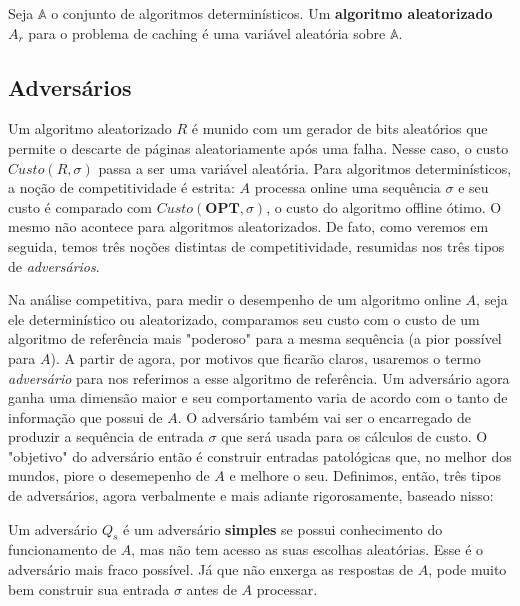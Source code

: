 \begin{definition}
  Seja \(\mathbb{A}\) o conjunto de algoritmos determinísticos. Um \textbf{algoritmo aleatorizado} \(A_r\) para o problema de caching é uma variável aleatória sobre \(\mathbb{A}\). 
\end{definition}


\subsection{Adversários}

Um algoritmo aleatorizado \(R\) é munido com um gerador de bits aleatórios que permite o descarte de páginas aleatoriamente após uma falha. Nesse caso, o custo \(Custo(R,\sigma)\) passa a ser uma variável aleatória. Para algoritmos determinísticos, a noção de competitividade é estrita: \(A\) processa online uma sequência \(\sigma\) e seu custo é comparado com \(Custo(\textbf{OPT}, \sigma)\), o custo do algoritmo offline ótimo. O mesmo não acontece para algoritmos aleatorizados. De fato, como veremos em seguida, temos três noções distintas de competitividade, resumidas nos três tipos de \textit{adversários}. 

Na análise competitiva, para medir o desempenho de um algoritmo online \(A\), seja ele determinístico ou aleatorizado, comparamos seu custo com o custo de um algoritmo de referência mais "poderoso" para a mesma sequência (a pior possível para \(A\)). 
A partir de agora, por motivos que ficarão claros, usaremos o termo \textit{adversário} para nos referimos a esse algoritmo de referência. Um adversário agora ganha uma dimensão maior e seu comportamento varia de acordo com o tanto de informação que possui de \(A\). O adversário também vai ser o encarregado de produzir a sequência de entrada \(\sigma\) que será usada para os cálculos de custo. O "objetivo" do adversário então é construir entradas patológicas que, no melhor dos mundos, piore o desemepenho de \(A\) e melhore o seu. Definimos, então, três tipos de adversários, agora verbalmente e mais adiante rigorosamente, baseado nisso:

\begin{definition}
  Um adversário \(Q_s\) é um adversário \textbf{simples} se possui conhecimento do funcionamento de \(A\), mas não tem acesso as suas escolhas aleatórias. Esse é o adversário mais fraco possível. Já que não enxerga as respostas de \(A\), pode muito bem construir sua entrada \(\sigma\) antes de \(A\) processar. 
\end{definition}

